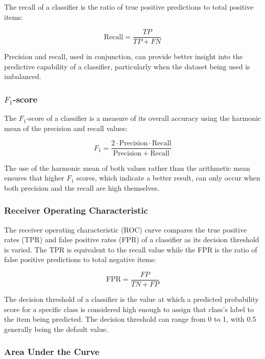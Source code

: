 The recall of a classifier is the ratio of true positive predictions to total positive items:

\begin{equation*}
    \mathrm{Recall} = \frac{TP}{TP + FN}
\end{equation*}

Precision and recall, used in conjunction, can provide better insight into the predictive capability of a classifier, particularly when the dataset being used is imbalanced.

\subsubsection{$F_1$-score}

The $F_1$-score of a classifier is a measure of its overall accuracy using the harmonic mean of the precision and recall values:

\begin{equation*}
    F_1 = \frac{2 \cdot \mathrm{Precision} \cdot \mathrm{Recall}}{\mathrm{Precision} + \mathrm{Recall}}
\end{equation*}

The use of the harmonic mean of both values rather than the arithmetic mean ensures that higher $F_1$ scores, which indicate a better result, can only occur when both precision and the recall are high themselves.

\subsubsection{Receiver Operating Characteristic}

The receiver operating characteristic (ROC) curve compares the true positive rates (TPR) and false positive rates (FPR) of a classifier as its decision threshold is varied. The TPR is equivalent to the recall value while the FPR is the ratio of false positive predictions to total negative items:

\begin{equation*}
    \mathrm{FPR} = \frac{FP}{TN + FP}
\end{equation*}

The decision threshold of a classifier is the value at which a predicted probability score for a specific class is considered high enough to assign that class's label to the item being predicted. The decision threshold can range from 0 to 1, with 0.5 generally being the default value.

\subsubsection{Area Under the Curve}

